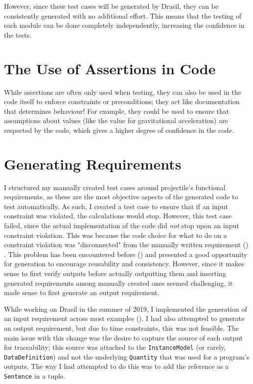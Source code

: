 However, since these test cases will be generated by Drasil, they can be
consistently generated with no additional effort. This means that the testing
of each module can be done completely independently, increasing the confidence
in the tests.

\section{The Use of Assertions in Code}
\label{chap:dev-proc:code-assertions}

While assertions are often only used when testing, they can also be used in
the code itself to enforce constraints or preconditions; they act like
documentation that determines behaviour! For example, they could be used to
ensure that assumptions about values (like the value for gravitational
acceleration) are respected by the code, which gives a higher degree of
confidence in the code.

\section{Generating Requirements}
\label{chap:dev-proc:gen-reqs}

I structured my manually created test cases around \acs{projectile}'s functional
requirements, as these are the most objective aspects of the generated code to
test automatically. As such, I created a test case to ensure that if an input
constraint was violated, the calculations would stop.
 However, this test case failed,
since the actual implementation of the code did \emph{not} stop upon an input
constraint violation. This was because the code choice for what to do on a
constraint violation was "disconnected" from the manually written requirement
() . This problem has been encountered
before () and presented a good
opportunity for generation to encourage reusability and consistency. However,
since it makes sense to first verify outputs before actually outputting them
and inserting generated requirements among manually created ones seemed
challenging, it made sense to first generate an output requirement.

While working on Drasil in the summer of 2019, I implemented the generation
of an input requirement across most examples ().
I had also attempted to generate an output requirement, but due to time
constraints, this was not feasible. The
main issue with this change was the desire to capture the source of each output
for traceability; this source was attached to the \texttt{InstanceModel}
(or rarely, \texttt{DataDefinition}) and not the underlying \texttt{Quantity}
that was used for a program's outputs. The way I had attempted to do this was
to add the reference as a \texttt{Sentence} in a tuple.

